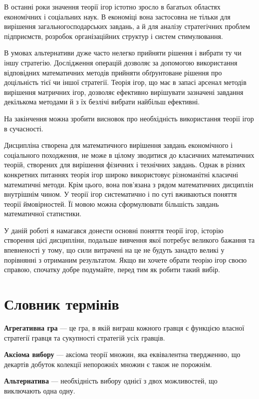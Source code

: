 \documentclass[a4paper]{article}
\begin{document}
В останні роки значення теорії ігор істотно зросло в багатьох областях економічних і соціальних наук. В економіці вона застосовна не тільки для вирішення загальногосподарських завдань, а й для аналізу стратегічних проблем підприємств, розробок організаційних структур і систем стимулювання.

В умовах альтернативи дуже часто нелегко прийняти рішення і вибрати ту чи іншу стратегію. Дослідження операцій дозволяє за допомогою використання відповідних математичних методів прийняти обґрунтоване рішення про доцільність тієї чи іншої стратегії. Теорія ігор, що має в запасі арсенал методів вирішення матричних ігор, дозволяє ефективно вирішувати зазначені завдання декількома методами й з їх безлічі вибрати найбільш ефективні.

На закінчення можна зробити висновок про необхідність використання теорії ігор в сучасності.

Дисципліна створена для математичного вирішення завдань економічного і соціального походження, не може в цілому зводитися до класичних математичних теорій, створених для вирішення фізичних і технічних завдань. Однак в різних конкретних питаннях теорія ігор широко використовує різноманітні класичні математичні методи. Крім цього, вона пов'язана з рядом математичних дисциплін внутрішнім чином. У теорії ігор систематично і по суті вживаються поняття теорії ймовірностей. Її мовою можна сформулювати більшість завдань математичної статистики.

У даній роботі я намагався донести основні поняття теорії ігор, історію створення цієї дисципліни, подальше вивчення якої потребує великого бажання та впевненості у тому, що сили витрачені на це не будуть занадто великі у порівнянні з отриманим результатом. Якщо ви хочете обрати теорію ігор своєю справою, спочатку добре подумайте, перед тим як робити такий вибір.

\clearpage
\section{Словник термінів}

\textbf{Агрегативна гра} — це гра, в якій виграш кожного гравця є функцією власної стратегії гравця та сукупності стратегій усіх гравців.

\textbf{Аксіома вибору} — аксіома теорії множин, яка еквівалентна твердженню, що декартів добуток колекції непорожніх множин є також не порожнім.

\textbf{Альтернатива} — необхідність вибору однієї з двох можливостей, що виключають одна одну.
\end{document}
